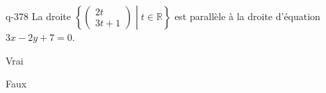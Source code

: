 \begin{truefalse}{q-378}
La droite  $\left\{\begin{pmatrix}2t\\3t+1\end{pmatrix}\middle| t\in\mathbb{R}\right\}$ est parallèle à la droite d'équation $3x-2y+7=0$.
\item* Vrai
\item Faux
\end{truefalse}


